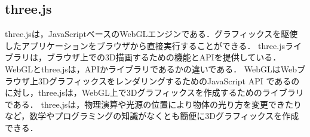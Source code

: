\subsection{three.js}
three.jsは，JavaScriptベースのWebGLエンジンである．グラフィックスを駆使したアプリケーションをブラウザから直接実行することができる．
three.jsライブラリは，ブラウザ上での3D描画するための機能とAPIを提供している．
WebGLとthree.jsは，APIかライブラリであるかの違いである．
WebGLはWebブラウザ上3DグラフィックスをレンダリングするためのJavaScript API であるのに対し，three.jsは，WebGL上で3Dグラフィックスを作成するためのライブラリである．
three.jsは，物理演算や光源の位置により物体の光り方を変更できたりなど，数学やプログラミングの知識がなくとも簡便に3Dグラフィックスを作成できる．
\\\hfill\cite{three.js}